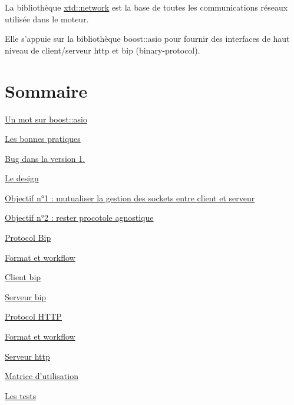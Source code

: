 La bibliothèque \hyperlink{namespacextd_1_1network}{xtd\-::network} est la base de toutes les communications réseaux utilisée dans le moteur.

Elle s'appuie sur la bibliothèque boost\-::asio pour fournir des interfaces de haut niveau de client/serveur http et bip (binary-\/protocol).\hypertarget{index_sec_main}{}\section{Sommaire}\label{index_sec_main}


 
\begin{DoxyEnumerate}
\item \hyperlink{index_sec_boost}{Un mot sur boost\-::asio} 
\begin{DoxyEnumerate}
\item \hyperlink{index_ssec_boost_practice}{Les bonnes pratiques}  
\item \hyperlink{index_ssec_boost_bug}{Bug dans la version 1.}  
\end{DoxyEnumerate}


\item \hyperlink{index_sec_design}{Le design} 
\begin{DoxyEnumerate}
\item \hyperlink{index_ssec_design_obj1}{Objectif n°1 \-: mutualiser la gestion des sockets entre client et serveur}  
\item \hyperlink{index_ssec_design_obj2}{Objectif n°2 \-: rester procotole agnostique}  
\end{DoxyEnumerate}


\item \hyperlink{index_sec_bip}{Protocol Bip} 
\begin{DoxyEnumerate}
\item \hyperlink{index_ssec_bip_cnx}{Format et workflow}  
\item \hyperlink{index_ssec_bip_client}{Client bip}  
\item \hyperlink{index_ssec_bip_server}{Serveur bip}  
\end{DoxyEnumerate}


\item \hyperlink{index_sec_http}{Protocol H\-T\-T\-P} 
\begin{DoxyEnumerate}
\item \hyperlink{index_ssec_http_cnx}{Format et workflow}  
\item \hyperlink{index_ssec_http_server}{Serveur http}  
\end{DoxyEnumerate}


\item \hyperlink{index_sec_usages}{Matrice d'utilisation} 


\item \hyperlink{index_sec_tests}{Les tests}  
\end{DoxyEnumerate}\par
\par




